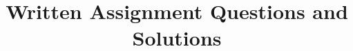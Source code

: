 \usepackage[utf8]{inputenc}
\usepackage{amsmath}
\usepackage{amssymb} %
\usepackage{graphicx} %
\usepackage{color}
\usepackage[usenames,dvipsnames]{xcolor}
\usepackage{hyperref} %
\usepackage{float} %
\title{Written Assignment Questions and Solutions}
\date{}
\author{}
\usepackage{fancyheadings}
\pagestyle{myheadings} %
\fancyhead{} %

\renewcommand{\subsectionmark}[1]{\markright{{\color{Sepia}\thesubsection} \ {\color{Sepia}#1}}}
\fancyhead[LE,LO]{\subsectionmark} %


\usepackage{enumitem}   %
\usepackage{anysize}
\marginsize{2.5cm}{2.5cm}{1cm}{1cm}
\newcommand{\Emph}[1]{\textbf{#1}} %
\newcommand{\R}{\mathbb{R}} 
\newcommand{\BM}{\begin{bmatrix}} %
\newcommand{\EM}{\end{bmatrix}} %
\newcommand{\BEN}{\begin{enumerate}[leftmargin=1.1cm]}%
\newcommand{\EEN}{\end{enumerate}} %
\newcommand{\MB}{\mathbf} %

\newcommand{\px}{\frac{\partial}{\partial x}} %
\newcommand{\py}{\frac{\partial}{\partial y}} %

\newcommand{\pxu}{\frac{\partial x}{\partial u}} %
\newcommand{\pxv}{\frac{\partial x}{\partial v}} %
\newcommand{\pxw}{\frac{\partial x}{\partial w}} %
\newcommand{\pyu}{\frac{\partial y}{\partial u}} %
\newcommand{\pyv}{\frac{\partial y}{\partial v}} %
\newcommand{\pyw}{\frac{\partial y}{\partial w}} %
\newcommand{\pzu}{\frac{\partial z}{\partial u}} %
\newcommand{\pzv}{\frac{\partial z}{\partial v}} %
\newcommand{\pzw}{\frac{\partial z}{\partial w}} %


